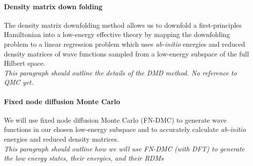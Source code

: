 \documentclass{article}
\begin{document}
\paragraph{Density matrix down folding} 
The density matrix downfolding method allows us to downfold a first-principles Hamiltonian into a low-energy effective theory by mapping the downfolding problem to a linear regression problem which uses \textit{ab-initio} energies and reduced density matrices of wave functions sampled from a low-energy subspace of the full Hilbert space.
\\
\textit{This paragraph should outline the details of the DMD method. No reference to QMC yet.}

\paragraph{Fixed node diffusion Monte Carlo}
We will use fixed node diffusion Monte Carlo (FN-DMC) to generate wave functions in our chosen low-energy subspace and to accurately calculate \textit{ab-initio} energies and reduced density matrices.
\\
\textit{This paragraph should outline how we will use FN-DMC (with DFT) to generate the low energy states, their energies, and their RDMs}
\end{document}
